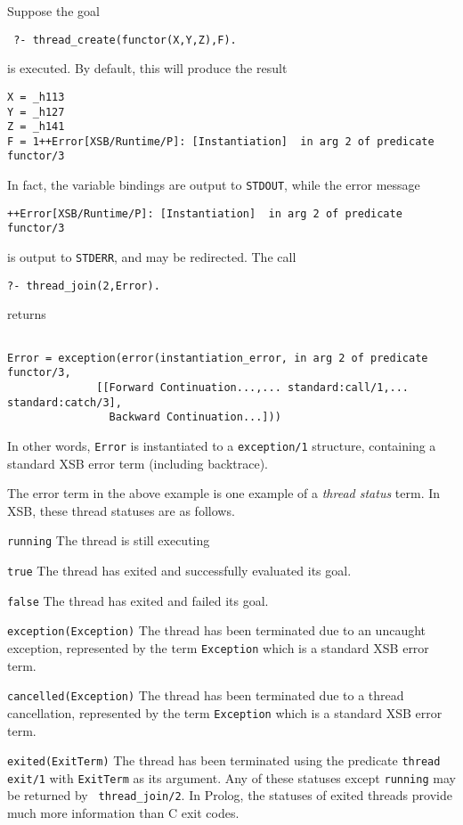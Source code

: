 \begin{example}
Suppose the goal 
\begin{verbatim}
 ?- thread_create(functor(X,Y,Z),F).
\end{verbatim}
%
is executed.  By default, this will produce the result
%
\begin{verbatim}
X = _h113
Y = _h127
Z = _h141
F = 1++Error[XSB/Runtime/P]: [Instantiation]  in arg 2 of predicate functor/3
\end{verbatim}
%
In fact, the variable bindings are output to {\tt STDOUT}, while the
error message
%
\begin{verbatim}
++Error[XSB/Runtime/P]: [Instantiation]  in arg 2 of predicate functor/3
\end{verbatim}
%
is output to {\tt STDERR}, and may be redirected.  The call
%
\begin{verbatim}
?- thread_join(2,Error).
\end{verbatim}
%
returns
%
\begin{verbatim}

Error = exception(error(instantiation_error, in arg 2 of predicate functor/3,
              [[Forward Continuation...,... standard:call/1,... standard:catch/3],
                Backward Continuation...]))
\end{verbatim}
%
In other words, {\tt Error} is instantiated to a {\tt exception/1}
structure, containing a standard XSB error term (including backtrace).
\end{example}
%
The error term in the above example is one example of a {\em thread
  status} term.  In XSB, these thread statuses are as follows.
\label{page:thread-status} 
%
\bi
\item {\tt running} The thread is still executing
%
\item {\tt true} The thread has exited and successfully evaluated its goal.
%
\item {\tt false} The thread has exited and failed its goal.
%
\item {\tt exception(Exception)} The thread has been terminated due to
  an uncaught exception, represented by the term {\tt Exception} which
  is a standard XSB error term.
%
\item {\tt cancelled(Exception)} The thread has been terminated due to
  a thread cancellation, represented by the term {\tt Exception} which
  is a standard XSB error term.
%
\item {\tt exited(ExitTerm)} The thread has been terminated using the
  predicate {\tt thread exit/1} with {\tt ExitTerm} as its argument.
\ei 
%
Any of these statuses except {\tt running} may be returned by {\tt
  thread\_join/2}.  In Prolog, the statuses of exited threads 
provide much more information than C exit codes.  

